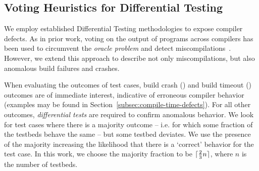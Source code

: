 \subsection{Voting Heuristics for Differential Testing}

We employ established Differential Testing methodologies to expose compiler defects. As in prior work, voting on the output of programs across compilers has been used to circumvent the \emph{oracle problem} and detect miscompilations~\cite{McKeeman1998}. However, we extend this approach to describe not only miscompilations, but also anomalous build failures and crashes.


%

\begin{table}[t!]
	\footnotesize %
	\centering %
	
	\caption{%
		OpenCL systems and the number of bug reports submitted to date. For each system, two testbeds are created, one with compiler optimizations, the other without.%
		\vspace{-.5em}
	}
	\label{tab:platforms}
\end{table}

When evaluating the outcomes of test cases, build crash (\bc) and build timeout (\bto) outcomes are of immediate interest, indicative of erroneous compiler behavior (examples may be found in Section~\ref{subsec:compile-time-defects}). For all other outcomes, \emph{differential tests} are required to confirm anomalous behavior. We look for test cases where there is a majority outcome -- i.e. for which some fraction of the testbeds behave the same -- but some testbed deviates. We use the presence of the majority increasing the likelihood that there is a `correct' behavior for the test case. In this work, we choose the majority fraction to be $\lceil\frac{2}{3}n\rceil$, where $n$ is the number of testbeds.

